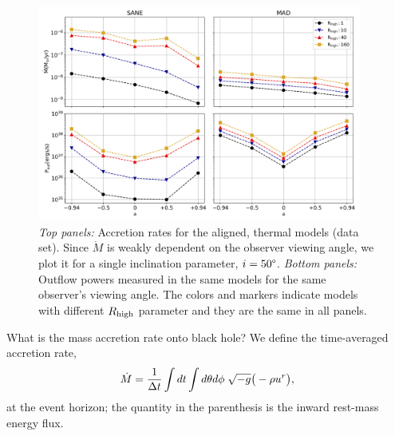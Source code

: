 \begin{figure}
\centering
\includegraphics[width=0.95\textwidth]{figures/illinoisv3_average_mdot_pout.png}
\caption{{\it Top panels:} Accretion rates for the aligned, thermal models (\kharma data set). Since $\dot{M}$ is weakly dependent on the observer viewing angle, we plot it for a single inclination parameter, $i=50\degree$. {\it Bottom panels:} Outflow powers measured in the same models for the same observer's viewing angle. The colors and markers indicate models with different $R_\mathrm{high}$ parameter and they are the same in all panels.}
\label{fig:accretion_outflow_power_illinois_thermal}
\end{figure}

What is the mass accretion rate onto \sgra black hole?
We define the time-averaged accretion rate,
\begin{equation}
    \dot{M} = \frac{1}{\Delta t}\int dt\int d\theta d\phi\hspace{0.1cm}\sqrt{-g}\big(-\rho u^{r}\big),
\end{equation}
at the event horizon; the quantity in the parenthesis is the inward rest-mass energy flux.

